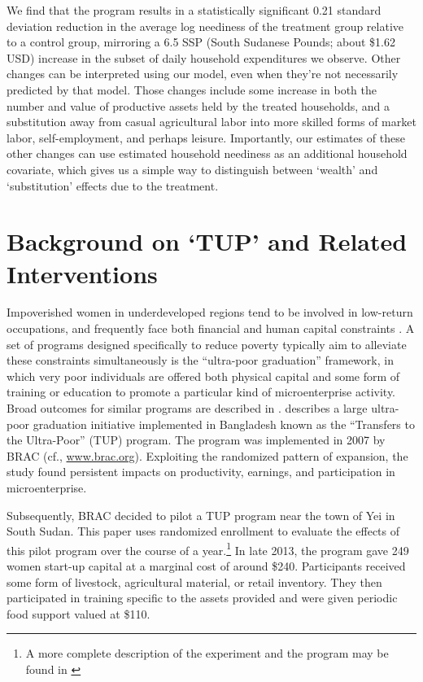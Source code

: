 \documentclass[11pt]{article}
\begin{document}
We find that the program results in a statistically significant 0.21
standard deviation reduction in the average log neediness of the
treatment group relative to a control group, mirroring a 6.5 SSP
(South Sudanese Pounds; about \$1.62 USD) increase in the subset 
of daily household expenditures we observe.  Other changes
can be interpreted using our model, even when they're not
necessarily predicted by that model.  Those changes include some
increase in both the number and value of productive assets held by
the treated households, and a substitution away from casual
agricultural labor into more skilled forms of market labor,
self-employment, and perhaps leisure.  Importantly, our estimates of
these other changes can use estimated household neediness as an
additional household covariate, which gives us a simple way to
distinguish between `wealth' and `substitution' effects due to the
treatment.

\section*{Background on `TUP' and Related Interventions}
\label{sec-2}

Impoverished women in underdeveloped regions tend to be involved in
low-return occupations, and frequently face both financial and human
capital constraints \citep{duflo2007}. A set of programs designed specifically
to reduce poverty typically aim to alleviate these constraints simultaneously is the ``ultra-poor graduation''
framework, in which very poor individuals are offered both physical
capital and some form of training or education to promote a particular
kind of microenterprise activity. Broad outcomes for similar programs are described in
\citep{banerjee2015}.  \cite{bandiera2017} describes a
large ultra-poor graduation initiative implemented in Bangladesh known
as the ``Transfers to the Ultra-Poor'' (TUP) program. The program was
implemented in 2007 by BRAC (cf., \url{www.brac.org}). Exploiting
the randomized pattern of expansion, the study found persistent
impacts on productivity, earnings, and participation in
microenterprise.

Subsequently, BRAC decided to pilot a TUP program near the town of
Yei in South Sudan.  This paper uses randomized enrollment to evaluate the
effects of this pilot program over the course of a year.\footnote{A more complete description
  of the experiment and the program may be found in
  \cite{Chowdhury-etal15}} In late 2013, the program gave 249 women
start-up capital at a marginal cost of around \$240. Participants
received some form of livestock, agricultural material, or retail
inventory. They then participated in training specific to the
assets provided and were given periodic food support valued at \$110.
\end{document}
